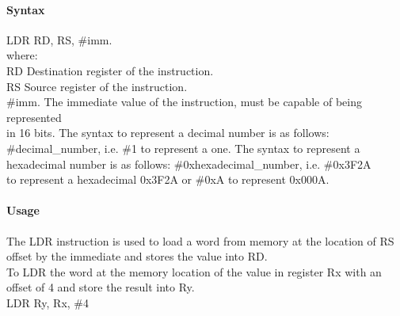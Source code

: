 \documentclass[12pt]{article}
\begin{document}
    \paragraph{Syntax}
    \begin{flushleft}
    LDR RD, RS, \#imm.\\
    \vspace{1em}        %
    where:\\
    \vspace{1em}
    RD  \hspace{3.6em} Destination register of the instruction.\\
    \vspace{1em}
    RS  \hspace{3.85em} Source register of the instruction.\\
    \vspace{1em}
    \#imm.  \hspace{1.8em} The immediate value of the instruction, must be capable of being represented\\             \hspace{5.4em} in 16 bits. The syntax to represent a decimal number is as follows:\\
            \hspace{5.4em} \#decimal\_number, i.e. \#1 to represent a one. The syntax to represent a\\
            \hspace{5.4em} hexadecimal number is as follows: \#0xhexadecimal\_number, i.e. \#0x3F2A \\
            \hspace{5.4em} to represent a hexadecimal 0x3F2A or \#0xA to represent 0x000A.\\
    \end{flushleft}
    
    \paragraph{Usage}
    \begin{flushleft}
    The LDR instruction is used to load a word from memory at the location of RS offset by the immediate and stores the value into RD.\\    
    \vspace{1em}
    To LDR the word at the memory location of the value in register Rx with an offset of 4 and store the result into Ry.\\
    \vspace{1em}
    LDR Ry, Rx, \#4
    \end{flushleft}
    
\end{document}
